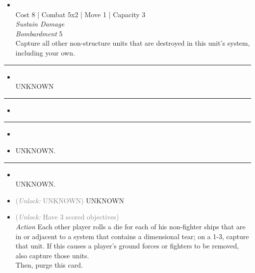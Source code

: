 \begin{multicols}{2}
\begin{itemize}
\item {}\\
Cost 8 | Combat 5x2 | Move 1 | Capacity 3 \\
\emph{Sustain Damage}\\
\emph{Bombardment} 5\\
Capture all other non-structure units that are destroyed in this unit's system, including your own.
\end{itemize}

\vspace{-10pt}\rule{\hsize}{0.4pt}\vspace{5pt}


\begin{itemize}
\item {} %
\\
UNKNOWN
\end{itemize}

\vspace{-10pt}\rule{\hsize}{0.4pt}\vspace{5pt}


\begin{itemize}
\item \dimensionalTearI
\end{itemize}

\vspace{-10pt}\rule{\hsize}{0.4pt}\vspace{5pt}

\begin{itemize}
\item \dimensionalTearII
\item UNKNOWN.
\end{itemize}

\vspace{-10pt}\rule{\hsize}{0.4pt}\vspace{5pt}


\begin{itemize}
\item {}\\
UNKNOWN.
\item {} \textcolor{gray}{(\emph{Unlock:} UNKNOWN)}
UNKNOWN
\item {} \textcolor{gray}{(\emph{Unlock:} Have 3 scored objectives)}\\
\emph{Action} Each other player rolls a die for each of his non-fighter ships that are in or adjacent to a system that contains a dimensional tear; on a 1-3, capture that unit. If this causes a player's ground forces or fighters to be removed, also capture those units.\\
Then, purge this card.
\end{itemize}


\end{multicols}
